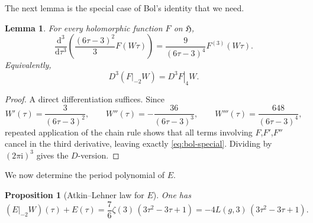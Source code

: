 \documentclass[11pt]{amsart}
\newtheorem{proposition}[theorem]{Proposition}
\newtheorem{lemma}[theorem]{Lemma}
\theoremstyle{definition}
\theoremstyle{remark}
\newcommand{\Hh}{\mathfrak{H}}
\newcommand{\dd}{\mathrm{d}}
\newcommand{\ii}{\mathrm{i}}
\newcommand{\Dop}{D}
\newcommand{\wt}[2]{\left.#1\right|_{#2}W}
\begin{document}
The next lemma is the special case of Bol's identity that we need.

\begin{lemma}\label{lem:bol}
For every holomorphic function $F$ on $\Hh$,
\begin{equation}\label{eq:bol-special}
\frac{\dd^3}{\dd\tau^3}\left(\frac{(6\tau-3)^2}{3}F(W\tau)\right)
=\frac{9}{(6\tau-3)^4}F^{(3)}(W\tau).
\end{equation}
Equivalently,
\[
\Dop^3(\wt{F}{-2})=\wt{\Dop^3F}{4}.
\]
\end{lemma}

\begin{proof}
A direct differentiation suffices. Since
\[
W'(\tau)=\frac{3}{(6\tau-3)^2},
\qquad
W''(\tau)=-\frac{36}{(6\tau-3)^3},
\qquad
W'''(\tau)=\frac{648}{(6\tau-3)^4},
\]
repeated application of the chain rule shows that all terms involving $F$,$F'$,$F''$ cancel in the third derivative, leaving exactly \eqref{eq:bol-special}. Dividing by $(2\pi\ii)^3$ gives the $\Dop$-version.
\end{proof}

We now determine the period polynomial of $E$.

\begin{proposition}[Atkin--Lehner law for $E$]\label{prop:E-transform}
One has
\begin{equation}\label{eq:E-transform}
(\wt{E}{-2})(\tau)+E(\tau)=\frac{7}{6}\zeta(3)\,(3\tau^2-3\tau+1)
=-4L(g,3)\,(3\tau^2-3\tau+1).
\end{equation}
\end{proposition}
\end{document}
